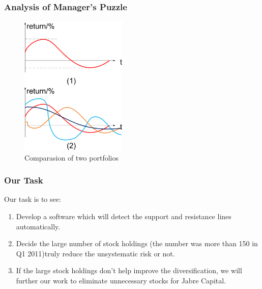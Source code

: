 \documentclass[compress,handout,10pt]{beamer}
\let\olditem\item
\renewcommand{\item}{\setlength{\itemsep}{0.5\baselineskip}\olditem}
\begin{document}
\begin{frame}
\frametitle{Analysis of Manager's Puzzle}
\begin{figure}[h]
\begin{center}
\includegraphics[width=2in]{images/7.png}
\end{center}
\caption{Comparasion of two portfolios}
\label{fig:ctp}
\end{figure}
\end{frame}

\begin{frame}
    \frametitle{Our Task}
Our task is to see:
\begin{enumerate}
\item Develop a software which will detect the support and resistance lines automatically.
 \item  Decide the large number of stock holdings (the number was more than 150 in Q1 2011)truly reduce the unsystematic risk or not.
\item  If the large stock holdings don't help improve the diversification, we will further our work to eliminate unnecessary stocks for Jabre Capital.
\end{enumerate}   
\end{frame}
\end{document}
